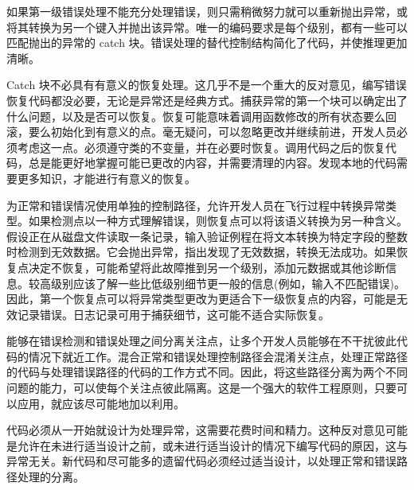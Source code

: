 如果第一级错误处理不能充分处理错误，则只需稍微努力就可以重新抛出异常，或将其转换为另一个键入并抛出该异常。唯一的编码要求是每个级别，都有一些可以匹配抛出的异常的 catch 块。错误处理的替代控制结构简化了代码，并使推理更加清晰。


Catch 块不必具有有意义的恢复处理。这几乎不是一个重大的反对意见，编写错误恢复代码都没必要，无论是异常还是经典方式。捕获异常的第一个块可以确定出了什么问题，以及是否可以恢复。恢复可能意味着调用函数修改的所有状态要么回滚，要么初始化到有意义的点。毫无疑问，可以忽略更改并继续前进，开发人员必须考虑这一点。必须遵守类的不变量，并在必要时恢复。调用代码之后的恢复代码，总是能更好地掌握可能已更改的内容，并需要清理的内容。发现本地的代码需要更多知识，才能进行有意义的恢复。


为正常和错误情况使用单独的控制路径，允许开发人员在飞行过程中转换异常类型。如果检测点以一种方式理解错误，则恢复点可以将该语义转换为另一种含义。假设正在从磁盘文件读取一条记录，输入验证例程在将文本转换为特定字段的整数时检测到无效数据。它会抛出异常，指出发现了无效数据，转换无法成功。如果恢复点决定不恢复，可能希望将此故障推到另一个级别，添加元数据或其他诊断信息。较高级别应该了解一些比低级别细节更一般的信息(例如，输入不匹配错误)。因此，第一个恢复点可以将异常类型更改为更适合下一级恢复点的内容，可能是无效记录错误。日志记录可用于捕获细节，这可能不适合实际恢复。


能够在错误检测和错误处理之间分离关注点，让多个开发人员能够在不干扰彼此代码的情况下就近工作。混合正常和错误处理控制路径会混淆关注点，处理正常路径的代码与处理错误路径的代码的工作方式不同。因此，将这些路径分离为两个不同问题的能力，可以使每个关注点彼此隔离。这是一个强大的软件工程原则，只要可以应用，就应该尽可能地加以利用。


代码必须从一开始就设计为处理异常，这需要花费时间和精力。这种反对意见可能是允许在未进行适当设计之前，或未进行适当设计的情况下编写代码的原因，这与异常无关。新代码和尽可能多的遗留代码必须经过适当设计，以处理正常和错误路径处理的分离。
